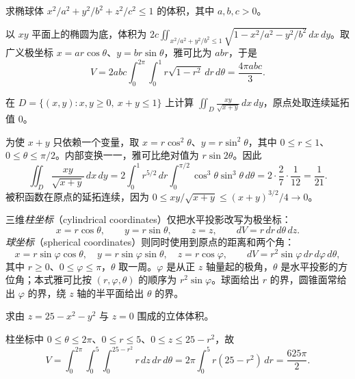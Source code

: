 \begin{example}
\label{ex:multiple-ellipsoid-volume}
求椭球体 $x^2/a^2+y^2/b^2+z^2/c^2\leq1$ 的体积，其中 $a,b,c>0$。
\end{example}
\begin{solve}
以 $xy$ 平面上的椭圆为底，体积为 $2c\iint_{x^2/a^2+y^2/b^2\leq1}\sqrt{1-x^2/a^2-y^2/b^2}\,dx\,dy$。取广义极坐标 $x=ar\cos\theta$、$y=br\sin\theta$，雅可比为 $abr$，于是
\[
    V=2abc\int_0^{2\pi}\int_0^1r\sqrt{1-r^2}\,dr\,d\theta
    =\frac{4\pi abc}{3}.
\]
\end{solve}

\begin{example}
\label{ex:multiple-simplex-squared-angle}
在 $D=\{(x,y):x,y\geq0,\ x+y\leq1\}$ 上计算 $\displaystyle\iint_D\frac{xy}{\sqrt{x+y}}\,dx\,dy$，原点处取连续延拓值 $0$。
\end{example}
\begin{solve}
为使 $x+y$ 只依赖一个变量，取 $x=r\cos^2\theta$、$y=r\sin^2\theta$，其中 $0\leq r\leq1$、$0\leq\theta\leq\pi/2$。内部变换一一，雅可比绝对值为 $r\sin2\theta$。因此
\[
    \iint_D\frac{xy}{\sqrt{x+y}}\,dx\,dy
    =2\int_0^1r^{5/2}\,dr\int_0^{\pi/2}\cos^3\theta\sin^3\theta\,d\theta
    =2\cdot\frac27\cdot\frac1{12}=\frac1{21}.
\]
被积函数在原点的延拓连续，因为 $0\leq xy/\sqrt{x+y}\leq(x+y)^{3/2}/4\to0$。
\end{solve}

三维\emph{柱坐标}（cylindrical coordinates）仅把水平投影改写为极坐标：
\begin{equation}
    x=r\cos\theta,\qquad y=r\sin\theta,\qquad z=z,
    \qquad dV=r\,dr\,d\theta\,dz.
    \label{eq:multiple-cylindrical-coordinates}
\end{equation}
\emph{球坐标}（spherical coordinates）则同时使用到原点的距离和两个角：
\begin{equation}
    x=r\sin\varphi\cos\theta,\quad
    y=r\sin\varphi\sin\theta,\quad z=r\cos\varphi,
    \qquad dV=r^2\sin\varphi\,dr\,d\varphi\,d\theta,
    \label{eq:multiple-spherical-coordinates}
\end{equation}
其中 $r\geq0$、$0\leq\varphi\leq\pi$，$\theta$ 取一周。$\varphi$ 是从正 $z$ 轴量起的极角，$\theta$ 是水平投影的方位角；本式雅可比按 $(r,\varphi,\theta)$ 的顺序为 $r^2\sin\varphi$。球面给出 $r$ 的界，圆锥面常给出 $\varphi$ 的界，绕 $z$ 轴的半平面给出 $\theta$ 的界。

\begin{example}
\label{ex:multiple-paraboloid-volume}
求由 $z=25-x^2-y^2$ 与 $z=0$ 围成的立体体积。
\end{example}
\begin{solve}
柱坐标中 $0\leq\theta\leq2\pi$、$0\leq r\leq5$、$0\leq z\leq25-r^2$，故
\[
    V=\int_0^{2\pi}\int_0^5\int_0^{25-r^2}r\,dz\,dr\,d\theta
    =2\pi\int_0^5r(25-r^2)\,dr=\frac{625\pi}{2}.
\]
\end{solve}

